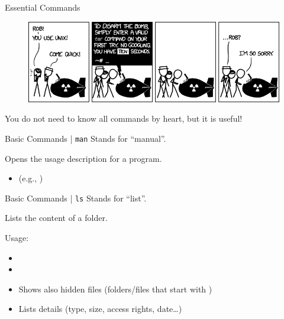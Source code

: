 \documentclass{setbeamer}
\begin{document}


\begin{frame}{Essential Commands}
    \begin{figure}[h]
        \includegraphics[width=14.5cm, keepaspectratio]{./resources/tar.png}
        \caption*{}
    \end{figure}


    \pause
    \centering
    You do not need to know all commands by heart, but it is useful!
\end{frame}

\begin{frame}{Basic Commands | \texttt{man}}
    Stands for ``manual''.

    \vspace{0.3cm}

    Opens the usage description for a program.

    \vspace{0.3cm}

    \begin{itemize}
        \item {} (e.g., )
    \end{itemize}
\end{frame}

\begin{frame}{Basic Commands | \texttt{ls}}
    Stands for ``list''.

    \vspace{0.3cm}

    Lists the content of a folder.

    \vspace{0.3cm}

    Usage:
    \begin{itemize}
        \item {}
        \item {}
        \item {}\textemdash Shows also hidden files (folders/files that start with  )
        \item {}\textemdash Lists details  (type, size, access rights, date\dots)
    \end{itemize}
\end{frame}
\end{document}
